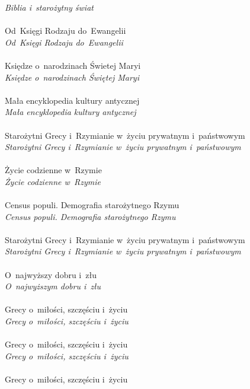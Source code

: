 \documentclass[a4paper,11pt]{article}
\begin{document}
\Powin \textit{Biblia i~starożytny świat} \\
 \\
\Jest  Od~Księgi Rodzaju do~Ewangelii \\
\Powin \textit{Od~Księgi Rodzaju do~Ewangelii} \\
 \\
\Jest  Księdze o~narodzinach Świetej Maryi \\
\Powin \textit{Księdze o~narodzinach Świętej Maryi} \\
 \\
\Jest  Mała encyklopedia kultury antycznej \\
\Powin \textit{Mała encyklopedia kultury antycznej} \\
 \\
\Jest  Starożytni Grecy i~Rzymianie w~życiu prywatnym i~państwowym \\
\Powin \textit{Starożytni Grecy i~Rzymianie w~życiu prywatnym
  i~państwowym} \\
 \\
\Jest  Życie codzienne w~Rzymie \\
\Powin \textit{Życie codzienne w~Rzymie} \\
 \\
\Jest  Census populi. Demografia starożytnego Rzymu \\
\Powin \textit{Census populi. Demografia starożytnego Rzymu} \\
 \\
\Jest  Starożytni Grecy i~Rzymianie w~życiu prywatnym i~państwowym \\
\Powin \textit{Starożytni Grecy i~Rzymianie w~życiu prywatnym
  i~państwowym} \\
 \\
\Jest  O~najwyższy dobru i~złu \\
\Powin \textit{O~najwyższym dobru i~złu} \\
 \\
\Jest  Grecy o~miłości, szczęściu i~życiu \\
\Powin \textit{Grecy o~miłości, szczęściu i~życiu} \\
 \\
\Jest  Grecy o~miłości, szczęściu i~życiu \\
\Powin \textit{Grecy o~miłości, szczęściu i~życiu} \\
 \\
\Jest  Grecy o~miłości, szczęściu i~życiu \\
\end{document}

